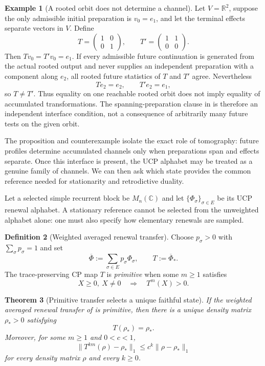 \documentclass[11pt]{article}
\newtheorem{theorem}{Theorem}[section]
\theoremstyle{definition}
\newtheorem{definition}[theorem]{Definition}
\newtheorem{example}[theorem]{Example}
\theoremstyle{remark}
\newcommand{\R}{\mathbb R}
\newcommand{\C}{\mathbb C}
\newcommand{\norm}[1]{\lVert#1\rVert}
\begin{document}
\begin{example}[A rooted orbit does not determine a channel]
\label{ex:rooted-orbit-not-tomographic}
Let \(V=\R^2\), suppose the only admissible initial preparation is
\(v_0=e_1\), and let the terminal effects separate vectors in \(V\).  Define
\[
 T=\begin{pmatrix}1&0\\0&1\end{pmatrix},
 \qquad
 T'=\begin{pmatrix}1&1\\0&0\end{pmatrix}.
\]
Then \(Tv_0=T'v_0=e_1\).  If every admissible future continuation is generated
from the actual rooted output and never supplies an independent preparation
with a component along \(e_2\), all rooted future statistics of \(T\) and
\(T'\) agree.  Nevertheless
\[
 Te_2=e_2,\qquad T'e_2=e_1,
\]
so \(T\ne T'\).  Thus equality on one reachable rooted orbit does not imply
equality of accumulated transformations.  The spanning-preparation clause in
 is therefore an independent interface
condition, not a consequence of arbitrarily many future tests on the given
orbit.
\end{example}

The proposition and counterexample isolate the exact role of tomography: future
profiles determine accumulated channels only when preparations span and effects
separate.  Once this interface is present, the UCP alphabet may be treated as a
genuine family of channels.  We can then ask which state provides the common
reference needed for stationarity and retrodictive duality.

Let a selected simple recurrent block be $M_n(\C)$ and let
$\{\Phi_\sigma\}_{\sigma\in E}$ be its UCP renewal alphabet.  A stationary
reference cannot be selected from the unweighted alphabet alone: one must also
specify how elementary renewals are sampled.

\begin{definition}[Weighted averaged renewal transfer]
\label{def:averaged-transfer}
Choose $p_\sigma>0$ with $\sum_\sigma p_\sigma=1$ and set
\[
 \overline\Phi:=\sum_{\sigma\in E}p_\sigma\Phi_\sigma,
 \qquad T:=\overline\Phi_*.
\]
The trace-preserving CP map $T$ is \emph{primitive} when some $m\ge1$ satisfies
\[
 X\ge0,\ X\ne0 \quad\Longrightarrow\quad T^m(X)>0.
\]
\end{definition}

\begin{theorem}[Primitive transfer selects a unique faithful state]
\label{thm:primitive-stationary-state}
If the weighted averaged renewal transfer of  is
primitive, then there is a unique density matrix $\rho_*>0$ satisfying
\[
 T(\rho_*)=\rho_*.
\]
Moreover, for some $m\ge1$ and $0<c<1$,
\[
 \norm{T^{km}(\rho)-\rho_*}_1
 \le c^k\norm{\rho-\rho_*}_1
\]
for every density matrix $\rho$ and every $k\ge0$.
\end{theorem}
\end{document}
